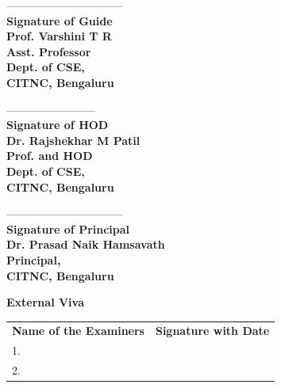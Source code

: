 \documentclass[12pt,a4paper]{article}
\begin{document}
\vspace{0.6cm}

\noindent
\begin{minipage}[t]{0.32\textwidth}
\raggedright
--------------------------------\\[6pt]
\textbf{Signature of Guide}\\
\textbf{Prof. Varshini T R}\\
\textbf{Asst. Professor}\\
\textbf{Dept. of CSE,}\\
\textbf{CITNC, Bengaluru}
\end{minipage}
\hfill
\begin{minipage}[t]{0.32\textwidth}
\centering
------------------------\\[6pt]
\textbf{Signature of HOD}\\
\textbf{Dr. Rajshekhar M Patil}\\
\textbf{Prof. and HOD}\\
\textbf{Dept. of CSE,}\\
\textbf{CITNC, Bengaluru}
\end{minipage}
\hfill
\begin{minipage}[t]{0.32\textwidth}
\raggedleft
--------------------------------\\[6pt]
\textbf{Signature of Principal}\\
\textbf{Dr. Prasad Naik Hamsavath}\\
\textbf{Principal,}\\
\textbf{CITNC, Bengaluru}
\end{minipage}

\vspace{0.4cm}

{\fontsize{13}{16}\bfseries\color{vtuBlue} External Viva\\[6pt]}
\noindent
\begin{tabular}{@{}p{8.5cm}@{}p{7.5cm}@{}}
\textbf{Name of the Examiners} & \textbf{Signature with Date} \\[10pt]
1. \underline{\hspace{6.5cm}} & \underline{\hspace{5.5cm}} \\[14pt]
2. \underline{\hspace{6.5cm}} & \underline{\hspace{5.5cm}} \\
\end{tabular}

\newpage
\end{document}
